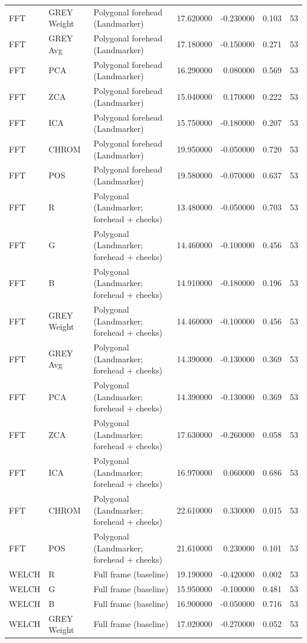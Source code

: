 \begin{table}[htbp]
\begin{tabular}{l l l r r l r}
FFT & GREY Weight & Polygonal forehead (Landmarker) & 17.620000 & -0.230000 & 0.103 & 53 \\
FFT & GREY Avg & Polygonal forehead (Landmarker) & 17.180000 & -0.150000 & 0.271 & 53 \\
FFT & PCA & Polygonal forehead (Landmarker) & 16.290000 & 0.080000 & 0.569 & 53 \\
FFT & ZCA & Polygonal forehead (Landmarker) & 15.040000 & 0.170000 & 0.222 & 53 \\
FFT & ICA & Polygonal forehead (Landmarker) & 15.750000 & -0.180000 & 0.207 & 53 \\
FFT & CHROM & Polygonal forehead (Landmarker) & 19.950000 & -0.050000 & 0.720 & 53 \\
FFT & POS & Polygonal forehead (Landmarker) & 19.580000 & -0.070000 & 0.637 & 53 \\
FFT & R & Polygonal (Landmarker; forehead + cheeks) & 13.480000 & -0.050000 & 0.703 & 53 \\
FFT & G & Polygonal (Landmarker; forehead + cheeks) & 14.460000 & -0.100000 & 0.456 & 53 \\
FFT & B & Polygonal (Landmarker; forehead + cheeks) & 14.910000 & -0.180000 & 0.196 & 53 \\
FFT & GREY Weight & Polygonal (Landmarker; forehead + cheeks) & 14.460000 & -0.100000 & 0.456 & 53 \\
FFT & GREY Avg & Polygonal (Landmarker; forehead + cheeks) & 14.390000 & -0.130000 & 0.369 & 53 \\
FFT & PCA & Polygonal (Landmarker; forehead + cheeks) & 14.390000 & -0.130000 & 0.369 & 53 \\
FFT & ZCA & Polygonal (Landmarker; forehead + cheeks) & 17.630000 & -0.260000 & 0.058 & 53 \\
FFT & ICA & Polygonal (Landmarker; forehead + cheeks) & 16.970000 & 0.060000 & 0.686 & 53 \\
FFT & CHROM & Polygonal (Landmarker; forehead + cheeks) & 22.610000 & 0.330000 & 0.015 & 53 \\
FFT & POS & Polygonal (Landmarker; forehead + cheeks) & 21.610000 & 0.230000 & 0.101 & 53 \\
WELCH & R & Full frame (baseline) & 19.190000 & -0.420000 & 0.002 & 53 \\
WELCH & G & Full frame (baseline) & 15.950000 & -0.100000 & 0.481 & 53 \\
WELCH & B & Full frame (baseline) & 16.900000 & -0.050000 & 0.716 & 53 \\
WELCH & GREY Weight & Full frame (baseline) & 17.020000 & -0.270000 & 0.052 & 53 \\

\end{tabular}
\end{table}
